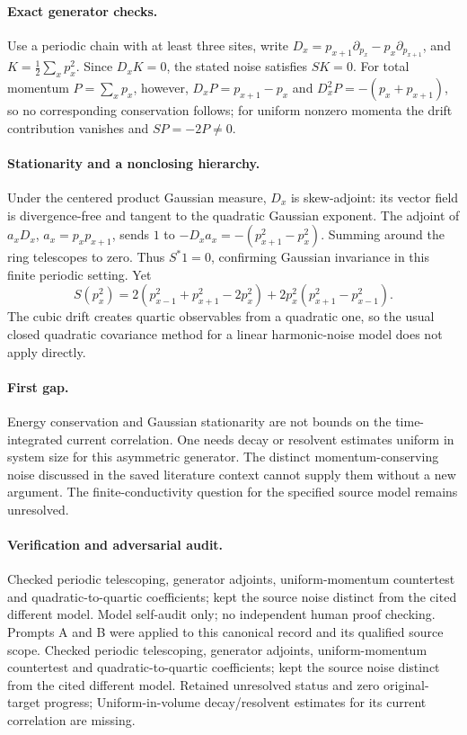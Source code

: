 \documentclass[11pt]{article}
\begin{document}
\paragraph{Exact generator checks.} Use a periodic chain with at least three sites, write $D_x=p_{x+1}\partial_{p_x}-p_x\partial_{p_{x+1}}$, and $K=\tfrac12\sum_xp_x^2$. Since $D_xK=0$, the stated noise satisfies $SK=0$. For total momentum $P=\sum_xp_x$, however, $D_xP=p_{x+1}-p_x$ and $D_x^2P=-(p_x+p_{x+1})$, so no corresponding conservation follows; for uniform nonzero momenta the drift contribution vanishes and $SP=-2P\ne0$.

\paragraph{Stationarity and a nonclosing hierarchy.} Under the centered product Gaussian measure, $D_x$ is skew-adjoint: its vector field is divergence-free and tangent to the quadratic Gaussian exponent. The adjoint of $a_xD_x$, $a_x=p_xp_{x+1}$, sends $1$ to $-D_xa_x=-(p_{x+1}^2-p_x^2)$. Summing around the ring telescopes to zero. Thus $S^*1=0$, confirming Gaussian invariance in this finite periodic setting. Yet
\[
 S(p_x^2)=2(p_{x-1}^2+p_{x+1}^2-2p_x^2)
 +2p_x^2(p_{x+1}^2-p_{x-1}^2).
\]
The cubic drift creates quartic observables from a quadratic one, so the usual closed quadratic covariance method for a linear harmonic-noise model does not apply directly.

\paragraph{First gap.} Energy conservation and Gaussian stationarity are not bounds on the time-integrated current correlation. One needs decay or resolvent estimates uniform in system size for this asymmetric generator. The distinct momentum-conserving noise discussed in the saved literature context cannot supply them without a new argument. The finite-conductivity question for the specified source model remains unresolved.

\paragraph{Verification and adversarial audit.}
Checked periodic telescoping, generator adjoints, uniform-momentum countertest and quadratic-to-quartic coefficients; kept the source noise distinct from the cited different model. Model self-audit only; no independent human proof checking. Prompts A and B were applied to this canonical record and its qualified source scope. Checked periodic telescoping, generator adjoints, uniform-momentum countertest and quadratic-to-quartic coefficients; kept the source noise distinct from the cited different model. Retained unresolved status and zero original-target progress; Uniform-in-volume decay/resolvent estimates for its current correlation are missing.
\end{document}

